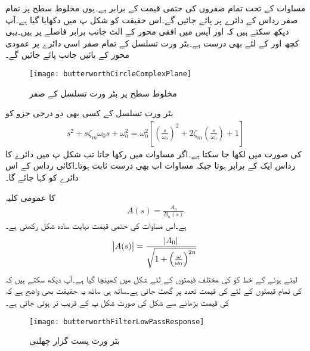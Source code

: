 مساوات  کے تحت تمام صفروں کی حتمی قیمت  کے برابر ہے۔یوں مخلوط سطح پر تمام صفر   رداس کے دائرے پر پائے جائیں گے۔اس حقیقت کو شکل  پ میں دکھایا گیا ہے۔آپ دیکھ سکتے ہیں کہ  اور  آپس میں افقی محور کے الٹ جانب برابر فاصلے پر ہیں۔یہی کچھ  اور  کے لئے بھی درست ہے۔بٹر ورت تسلسل کے تمام صفر اسی دائرے پر عمودی محور کے بائیں جانب پائے جائیں گے۔ 
\begin{figure}
\centering
\texttt{[image: butterworthCircleComplexPlane]}
\caption{مخلوط سطح پر بٹر ورت  تسلسل کے صفر}
\label{شکل_تعددی_ردعمل_بٹر_ورت_تسلسل_کے_صفر}
\end{figure}

بٹر ورت تسلسل کے کسی بھی دو درجی جزو کو
\begin{align*}
s^2+s \zeta_m \omega_0 s+\omega_0^2=\omega_0^2 \left[\left(\frac{s}{\omega_0} \right)^2 +2 \zeta_m \left(\frac{s}{\omega_0} \right)+1\right]
\end{align*}
کی صورت میں لکھا جا سکتا ہے۔اگر  مساوات  میں  رکھا جاتا تب شکل  پ میں دائرے کا رداس ایک کے برابر ہوتا جبکہ مساوات  اب بھی  درست ثابت ہوتا۔اکائی رداس کے اس دائرے کو   کہا جائے گا۔

 کا عمومی کلیہ
\begin{align}\label{مساوات_تعددی_ردعمل_بٹرورت_پست_گزار}
A(s)=\frac{A_0}{B_n(s)}
\end{align}
ہے۔اس مساوات کی حتمی قیمت نہایت سادہ شکل رکھتی ہے۔
\begin{align}\label{مساوات_تعددی_ردعمل_بٹرورت_حتمی}
\abs{A(s)}=\frac{\abs{A_0}}{\sqrt{1+\left(\frac{\omega}{\omega_0} \right)^{2n}}}
\end{align}
 لیتے ہوئے  کے خط کو  کی مختلف قیمتوں کے لئے شکل  میں کھینچا گیا ہے۔آپ دیکھ سکتے ہیں کہ  کی تمام قیمتوں کے لئے  کی قیمت  تعدد پر  گھٹ جاتی ہے۔ساتھ ہی ساتھ یہ حقیقت بھی واضح ہے کہ  کی  قیمت بڑھانے سے شکل  کی صورت  شکل  پ کے قریب تر ہوتی جاتی ہے۔ 
\begin{figure}
\centering
\texttt{[image: butterworthFilterLowPassResponse]}
\caption{بٹر ورت پست گزار چھلنی}
\label{شکل_تعددی_ردعمل_بٹر_ورت_پست_گزار}
\end{figure}

